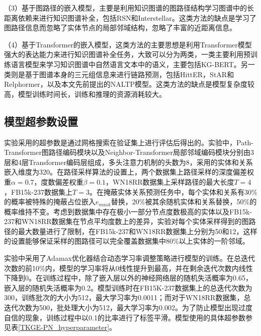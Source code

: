 （3）基于图路径的嵌入模型，主要是利用知识图谱的图路径结构学习图谱中的长距离依赖来进行知识图谱补全，包括RSN和Interstellar。这类方法的缺点是学习了图路径信息而忽略了实体节点的局部邻域结构，忽略了丰富的近距离信息。

（4）基于Transformer的嵌入模型，这类方法的主要思想是利用Transformer模型强大的表达能力来进行知识图谱补全任务，大致可以分为两类，一类主要利用预训练语言模型来学习知识图谱中自然语言文本中的语义，主要包括KG-BERT。另一类则是基于图谱本身的三元组信息来进行链路预测，包括HittER，StAR和Relphormer，以及本文先前提出的NALTP模型。这类方法的缺点是模型复杂度较高，模型训练时间长，训练和推理的资源消耗较大。

\subsection{模型超参数设置}

实验采用的超参数是通过网格搜索在验证集上进行评估后得出的。实验中，Path-Transformer图路径编码模块以及Neighbor-Transformer局部邻域编码模块分别由3层和4层Transformer编码层组成，多头注意力机制的头数为8，采用的实体和关系嵌入维度为320。在路径采样算法的设置上，两个数据集上路径采样的深度偏差权重$\alpha = 0.7$，度数偏差权重$\beta=0.1$，WN18RR数据集上采样路径的最大长度$T=4$，FB15k-237数据集上$T=3$。在掩蔽实体关系预测任务中，每个实体和关系有30\%的概率被特殊的掩蔽占位嵌入$e_{mask}$替换，20\%被其余随机实体和关系替换，50\%的概率维持不变。考虑到数据集中存在极小一部分节点度数极高的实体以及FB15k-237和WN18RR数据集在节点平均度数上的差异，实验对每个实体采样得到的图路径的最大数量进行了限制，在FB15k-237和WN18RR数据集上分别为50和12，这样的设置能够保证采样的图路径可以完全覆盖数据集中80\%以上实体的一阶邻域。

实验中采用了Adamax优化器结合动态学习率调整策略进行模型的训练。在总迭代次数的前10\%内，模型的学习率将从0线性提升到最高，并在剩余迭代次数内线性下降到0。在训练过程中，除了嵌入层以外的神经网络层的随机失活概率为0.65，嵌入层的随机失活概率为0.2。模型训练时在FB15K-237数据集上的总迭代次数为300，训练批次的大小为512，最大学习率为0.0011；而对于WN18RR数据集，总迭代次数为500，批处理大小为512，最大学习率为0.002。为了防止模型出现过度自信的现象，训练过程中以0.1的比率进行了标签平滑。模型使用的具体超参数参见表\ref{TKGE-PN_hyperparameter}。

